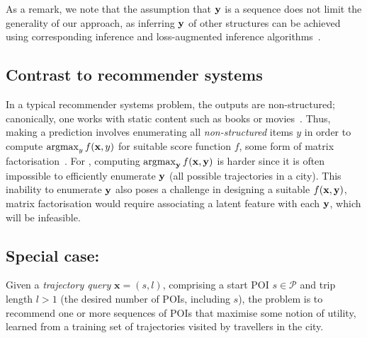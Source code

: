 As a remark, we note that the assumption that $\mathbf{y}$ is a sequence does not limit the generality of our approach,
as inferring $\mathbf{y}$ of other structures can be achieved using corresponding inference and loss-augmented inference algorithms~\cite{joachims2009predicting}.  %


%
\subsection{Contrast to recommender systems}

%
In a typical recommender systems problem, the outputs are non-structured; canonically, one works with {static} content such as books or movies~\citep{Goldberg:1992,Sarwar:2001,Netflix}.
Thus, making a prediction involves enumerating all {\em non-structured} items $y$ in order to compute $\operatorname*{argmax}_y f(\mathbf{x},y)$ for suitable score function $f$, \eg some form of matrix factorisation~\citep{Koren:2009}.
For {\seqrec}, computing $\operatorname*{argmax}_{\mathbf{y}} f(\mathbf{x},\mathbf{y})$ is harder since it is often impossible to efficiently enumerate $\mathbf{y}$ (\eg all possible trajectories in a city).
This inability to enumerate $\mathbf{y}$ also poses a challenge in designing a suitable $f(\mathbf{x},\mathbf{y})$,
\eg
matrix factorisation
would require associating a latent feature with each $\mathbf{y}$, which will be infeasible.



%
\subsection{Special case: {\trajrec}}

Given a \emph{trajectory query} $\mathbf{x} = (s, l)$,
comprising a start POI $s \in \mathcal{P}$ and trip length
$l \!>\! 1$ (\ie the desired number of POIs, including $s$),
the \emph{\trajrec} problem is to
recommend one or more sequences of POIs %
that maximise some notion of utility,
learned from a training set
of trajectories visited by travellers in the city.


